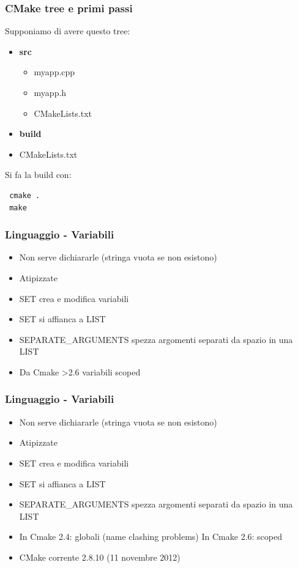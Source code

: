 \documentclass[10pt] {beamer}
\begin{document}
\begin{frame}[fragile]
\frametitle{CMake tree e primi passi}
Supponiamo di avere questo tree:

\begin{itemize}
\item<1-> \textbf{src}
\begin{itemize}
	\item myapp.cpp
	\item myapp.h
	\item CMakeLists.txt
\end{itemize}
\item<2-> \textbf{build}
\item<3-> CMakeLists.txt
\end{itemize}

Si fa la build con:
\begin{verbatim}
 cmake .
 make
\end{verbatim}
\end{frame}



\begin{frame}
	\frametitle{Linguaggio - Variabili}
	\begin{itemize}
		\item Non serve dichiararle (stringa vuota se non esistono)
		\item Atipizzate
		\item SET crea e modifica variabili
		\item SET si affianca a LIST
		\item SEPARATE\_ARGUMENTS spezza argomenti separati da spazio in una LIST
		\item Da Cmake >2.6 variabili scoped
\end{itemize}
\end{frame}

\begin{frame}
	\frametitle{Linguaggio - Variabili}
	\begin{itemize}
		\item Non serve dichiararle (stringa vuota se non esistono)
		\item Atipizzate
		\item SET crea e modifica variabili
		\item SET si affianca a LIST
		\item SEPARATE\_ARGUMENTS spezza argomenti separati da spazio in una LIST
		\item In Cmake 2.4: globali (name clashing problems)  In Cmake 2.6: scoped
		\item CMake corrente 2.8.10 (11 novembre 2012)
\end{itemize}
\end{frame}
\end{document}
